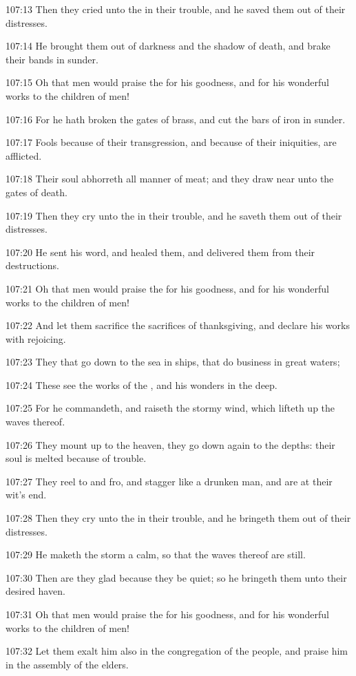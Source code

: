 107:13 Then they cried unto the \LORD in their trouble, and he saved
them out of their distresses.

107:14 He brought them out of darkness and the shadow of death, and
brake their bands in sunder.

107:15 Oh that men would praise the \LORD for his goodness, and for his
wonderful works to the children of men!

107:16 For he hath broken the gates of brass, and cut the bars of iron
in sunder.

107:17 Fools because of their transgression, and because of their
iniquities, are afflicted.

107:18 Their soul abhorreth all manner of meat; and they draw near
unto the gates of death.

107:19 Then they cry unto the \LORD in their trouble, and he saveth
them out of their distresses.

107:20 He sent his word, and healed them, and delivered them from
their destructions.

107:21 Oh that men would praise the \LORD for his goodness, and for his
wonderful works to the children of men!

107:22 And let them sacrifice the sacrifices of thanksgiving, and
declare his works with rejoicing.

107:23 They that go down to the sea in ships, that do business in
great waters;

107:24 These see the works of the \LORD, and his wonders in the deep.

107:25 For he commandeth, and raiseth the stormy wind, which lifteth
up the waves thereof.

107:26 They mount up to the heaven, they go down again to the depths:
their soul is melted because of trouble.

107:27 They reel to and fro, and stagger like a drunken man, and are
at their wit's end.

107:28 Then they cry unto the \LORD in their trouble, and he bringeth
them out of their distresses.

107:29 He maketh the storm a calm, so that the waves thereof are
still.

107:30 Then are they glad because they be quiet; so he bringeth them
unto their desired haven.

107:31 Oh that men would praise the \LORD for his goodness, and for his
wonderful works to the children of men!

107:32 Let them exalt him also in the congregation of the people, and
praise him in the assembly of the elders.

